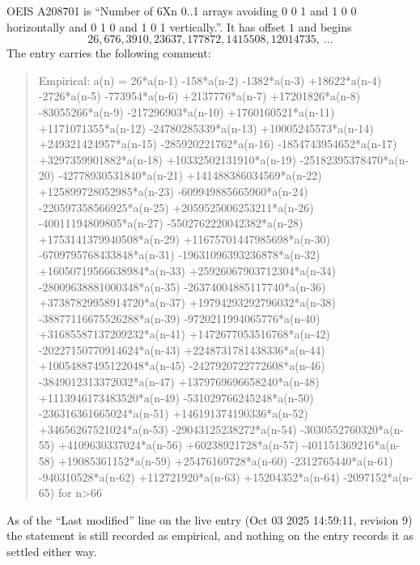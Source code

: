 \documentclass[11pt,a4paper]{article}
\theoremstyle{plain}
\theoremstyle{definition}
\begin{document}
OEIS A208701 is ``Number of 6Xn 0..1 arrays avoiding 0 0 1 and 1 0 0 horizontally and 0 1 0 and 1 0 1 vertically.''. It has offset
$1$ and begins
\[
26, 676, 3910, 23637, 177872, 1415508, 12014735,\ \dots
\]
The entry carries the following comment:
\begin{quote}\small
Empirical: a(n) = 26*a(n-1) -158*a(n-2) -1382*a(n-3) +18622*a(n-4) -2726*a(n-5) -773954*a(n-6) +2137776*a(n-7) +17201826*a(n-8) -83055266*a(n-9) -217296903*a(n-10) +1760160521*a(n-11) +1171071355*a(n-12) -24780285339*a(n-13) +10005245573*a(n-14) +249321424957*a(n-15) -285920221762*a(n-16) -1854743954652*a(n-17) +3297359901882*a(n-18) +10332502131910*a(n-19) -25182395378470*a(n-20) -42778930531840*a(n-21) +141488386034569*a(n-22) +125899728052985*a(n-23) -609949885665960*a(n-24) -220597358566925*a(n-25) +2059525006253211*a(n-26) -40011194809805*a(n-27) -5502762220042382*a(n-28) +1753141379940508*a(n-29) +11675701447985698*a(n-30) -6709795768433848*a(n-31) -19631096393236878*a(n-32) +16050719566638984*a(n-33) +25926067903712304*a(n-34) -28009638881000348*a(n-35) -26374004885117740*a(n-36) +37387829958914720*a(n-37) +19794293292796032*a(n-38) -38877116675526288*a(n-39) -9720211994065776*a(n-40) +31685587137209232*a(n-41) +1472677053516768*a(n-42) -20227150770914624*a(n-43) +2248731781438336*a(n-44) +10054887495122048*a(n-45) -2427920722772608*a(n-46) -3849012313372032*a(n-47) +1379769696658240*a(n-48) +1113946173483520*a(n-49) -531029766245248*a(n-50) -236316361665024*a(n-51) +146191374190336*a(n-52) +34656267521024*a(n-53) -29043125238272*a(n-54) -3030552760320*a(n-55) +4109630337024*a(n-56) +60238921728*a(n-57) -401151369216*a(n-58) +19085361152*a(n-59) +25476169728*a(n-60) -2312765440*a(n-61) -940310528*a(n-62) +112721920*a(n-63) +15204352*a(n-64) -2097152*a(n-65) for n>66
\end{quote}
As of the ``Last modified'' line on the live entry (Oct 03 2025 14:59:11, revision
9) the statement is still recorded as empirical, and nothing on the entry
records it as settled either way.
\end{document}
